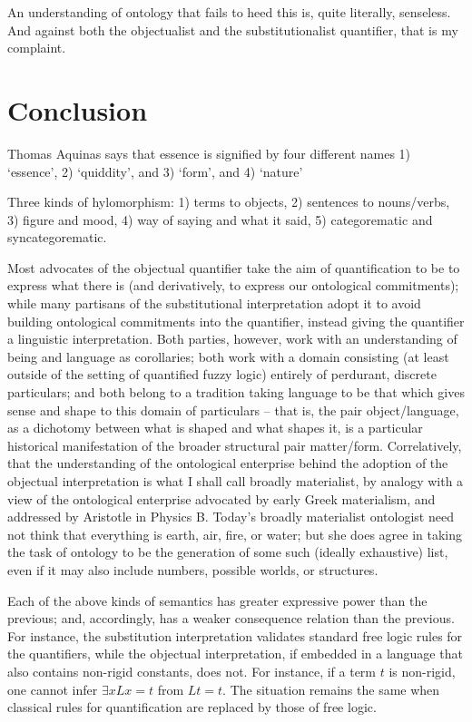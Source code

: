 \documentclass[]{article}
\begin{document}
An understanding of ontology that fails to heed this is, quite literally, senseless. And against both the objectualist and the substitutionalist quantifier, that is my complaint.

\section{Conclusion}
Thomas Aquinas says that essence is signified by four different names 1) `essence', 2) `quiddity', and 3) `form', and 4) `nature' 

Three kinds of hylomorphism: 1) terms to objects, 2) sentences to nouns/verbs, 3) figure and mood, 4) way of saying and what it said, 5) categorematic and syncategorematic.

Most advocates of the objectual quantifier take the aim of quantification to be to express what there is (and derivatively, to express our ontological commitments); while many partisans of the substitutional interpretation adopt it to avoid building ontological commitments into the quantifier, instead giving the quantifier a linguistic interpretation. Both parties, however, work with an understanding of being and language as corollaries; both work with a domain consisting (at least outside of the setting of quantified fuzzy logic) entirely of perdurant, discrete particulars; and both belong to a tradition taking language to be that which gives sense and shape to this domain of particulars – that is, the pair object/language, as a dichotomy between what is shaped and what shapes it, is a particular historical manifestation of the broader structural pair matter/form. Correlatively, that the understanding of the ontological enterprise behind the adoption of the objectual interpretation is what I shall call broadly materialist, by analogy with a view of the ontological enterprise advocated by early Greek materialism, and addressed by Aristotle in Physics Β. Today’s broadly materialist ontologist need not think that everything is earth, air, fire, or water; but she does agree in taking the task of ontology to be the generation of some such (ideally exhaustive) list, even if it may also include numbers, possible worlds, or structures. 

Each of the above kinds of semantics has greater expressive power than the previous; and, accordingly, has a weaker consequence relation than the previous. For instance, the substitution interpretation validates standard free logic rules for the quantifiers, while the objectual interpretation, if embedded in a language that also contains non-rigid constants, does not. For instance, if a term $t$ is non-rigid, one cannot infer $\exists x Lx=t$ from $Lt=t$. The situation remains the same when classical rules for quantification are replaced by those of free logic.
\end{document}
